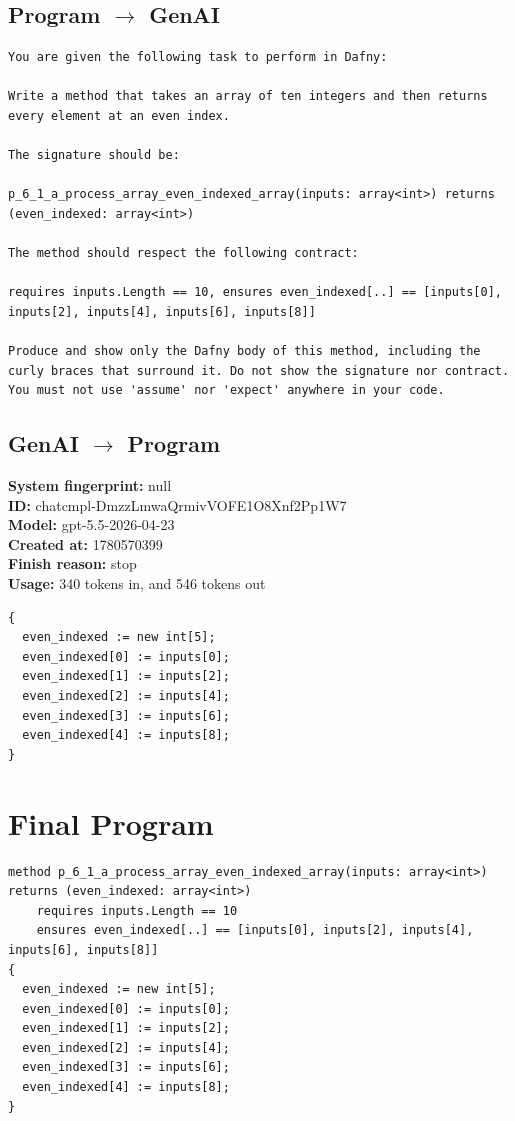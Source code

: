 \documentclass{article}
\begin{document}
\subsection*{Program $\rightarrow$ GenAI}
\begin{lstlisting}
You are given the following task to perform in Dafny:

Write a method that takes an array of ten integers and then returns every element at an even index.

The signature should be:

p_6_1_a_process_array_even_indexed_array(inputs: array<int>) returns (even_indexed: array<int>)

The method should respect the following contract:

requires inputs.Length == 10, ensures even_indexed[..] == [inputs[0], inputs[2], inputs[4], inputs[6], inputs[8]]

Produce and show only the Dafny body of this method, including the curly braces that surround it. Do not show the signature nor contract. You must not use 'assume' nor 'expect' anywhere in your code.
\end{lstlisting}
\subsection*{GenAI $\rightarrow$ Program}
\textbf{System fingerprint: }null
\\\textbf{ID: }chatcmpl-DmzzLmwaQrmivVOFE1O8Xnf2Pp1W7
\\\textbf{Model: }gpt-5.5-2026-04-23
\\\textbf{Created at: }1780570399
\\\textbf{Finish reason: }stop
\\\textbf{Usage: }340 tokens in, and 546 tokens out
\begin{lstlisting}
{
  even_indexed := new int[5];
  even_indexed[0] := inputs[0];
  even_indexed[1] := inputs[2];
  even_indexed[2] := inputs[4];
  even_indexed[3] := inputs[6];
  even_indexed[4] := inputs[8];
}
\end{lstlisting}
\section*{Final Program}
\begin{lstlisting}
method p_6_1_a_process_array_even_indexed_array(inputs: array<int>) returns (even_indexed: array<int>)
	requires inputs.Length == 10
	ensures even_indexed[..] == [inputs[0], inputs[2], inputs[4], inputs[6], inputs[8]]
{
  even_indexed := new int[5];
  even_indexed[0] := inputs[0];
  even_indexed[1] := inputs[2];
  even_indexed[2] := inputs[4];
  even_indexed[3] := inputs[6];
  even_indexed[4] := inputs[8];
}
\end{lstlisting}
\end{document}
